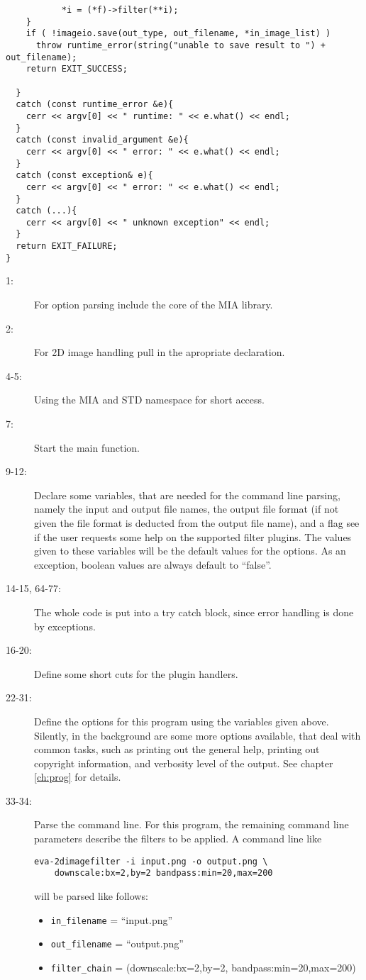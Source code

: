 \documentclass[english, 10pt, a4paper,headsepline,openany]{scrbook}
\begin{document}
\begin{lstlisting}
           *i = (*f)->filter(**i);
    }
    if ( !imageio.save(out_type, out_filename, *in_image_list) )
      throw runtime_error(string("unable to save result to ") + out_filename);
    return EXIT_SUCCESS; 

  } 
  catch (const runtime_error &e){
    cerr << argv[0] << " runtime: " << e.what() << endl;
  }
  catch (const invalid_argument &e){
    cerr << argv[0] << " error: " << e.what() << endl;
  }
  catch (const exception& e){
    cerr << argv[0] << " error: " << e.what() << endl;
  }
  catch (...){
    cerr << argv[0] << " unknown exception" << endl;
  }
  return EXIT_FAILURE;
}  
\end{lstlisting}  

\begin{description}
\item [1:] For option parsing include the core of the MIA library. 
\item [2:] For 2D image handling pull in the apropriate declaration. 
\item [4-5:] Using the MIA and STD namespace for short access. 
\item [7:] Start the main function. 
\item [9-12:] Declare some variables, that are needed for the command line parsing, namely the input and output file names, 
    the output file format (if not given the file format is deducted from the output file name), and a flag 
    see if the user requests some help on the supported filter plugins. 
    The values given to these variables will be the default values for the options. 
     As an exception, boolean values are always default to ``false''. 
\item [14-15, 64-77:] The whole code is put into a try catch block, since error handling is done by exceptions. 
\item [16-20:] Define some short cuts for the plugin handlers.
\item [22-31:] Define the options for this program using the variables given above. 
    Silently, in the background are some more options available, that deal with common tasks, such as printing out the general
      help, printing out copyright information, and verbosity level of the output. 
    See chapter \ref{ch:prog} for details. 
\item [33-34:] Parse the command line. 
     For this program, the remaining command line parameters describe the filters to be applied. 
    A command line like 
    \lstset{language=bash,numbers=none}
    \begin{lstlisting}
eva-2dimagefilter -i input.png -o output.png \
    downscale:bx=2,by=2 bandpass:min=20,max=200
    \end{lstlisting}
      will be parsed like follows:
      \begin{itemize}
      \item  \texttt{in\_filename} = ``input.png''
      \item  \texttt{out\_filename} = ``output.png''
      \item  \texttt{filter\_chain} = (downscale:bx=2,by=2, bandpass:min=20,max=200)
      \end{itemize}


\end{description}
\end{document}
